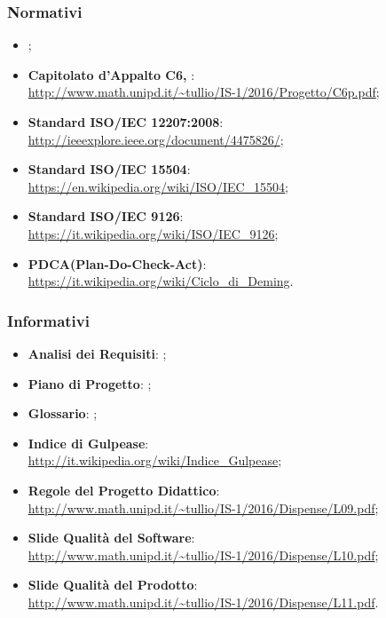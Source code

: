 		\subsubsection{Normativi}
		\begin{itemize}
			\item \NdP;
			\item \textbf{Capitolato d'Appalto C6, \proj}:
			\\ \url{http://www.math.unipd.it/~tullio/IS-1/2016/Progetto/C6p.pdf};
			\item \textbf{Standard ISO/IEC 12207:2008}:
			\\ \url{http://ieeexplore.ieee.org/document/4475826/};
			\item \textbf{Standard ISO/IEC 15504}:
			\\ \url{https://en.wikipedia.org/wiki/ISO/IEC_15504};
			\item \textbf{Standard ISO/IEC 9126}:
			\\ \url{https://it.wikipedia.org/wiki/ISO/IEC_9126};
			\item \textbf{PDCA(Plan-Do-Check-Act)}:
			\\ \url{https://it.wikipedia.org/wiki/Ciclo_di_Deming}.
		\end{itemize}
		
		\subsubsection{Informativi}
		\begin{itemize}
			\item \textbf{Analisi dei Requisiti}: \AdR;
			\item \textbf{Piano di Progetto}: \PdP;
			\item \textbf{Glossario}: \Glossario;
			\item \textbf{Indice di Gulpease}:
			\\ \url{http://it.wikipedia.org/wiki/Indice_Gulpease};
			\item \textbf{Regole del Progetto Didattico}:
			\\ \url{http://www.math.unipd.it/~tullio/IS-1/2016/Dispense/L09.pdf};
			\item \textbf{Slide Qualità del Software}:
			\\ \url{http://www.math.unipd.it/~tullio/IS-1/2016/Dispense/L10.pdf};
			\item \textbf{Slide Qualità del Prodotto}:
			\\ \url{http://www.math.unipd.it/~tullio/IS-1/2016/Dispense/L11.pdf}.
		\end{itemize}
\newpage
